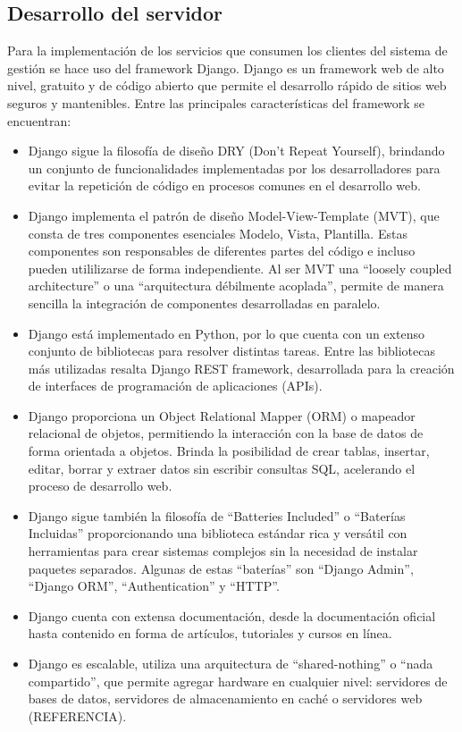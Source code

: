 \subsection{Desarrollo del servidor}
Para la implementación de los servicios que consumen los clientes del 
sistema de gestión se hace uso del framework Django. Django es un framework
web de alto nivel, gratuito y de código abierto que permite el desarrollo rápido de 
sitios web seguros y mantenibles. Entre las principales características
del framework se encuentran:

\begin{itemize}
    \item Django sigue la filosofía
    de diseño DRY (Don't Repeat Yourself), brindando un conjunto de funcionalidades implementadas
    por los desarrolladores para evitar la repetición de código en procesos
    comunes en el desarrollo web.
    \item Django implementa el patrón de diseño Model-View-Template (MVT), que
    consta de tres componentes esenciales Modelo, Vista,
    Plantilla. Estas componentes son responsables de diferentes
    partes del código e incluso pueden utililizarse de forma independiente. Al ser MVT una 
    ``loosely coupled architecture'' o una ``arquitectura
    débilmente acoplada'', permite de manera sencilla la integración de componentes
    desarrolladas en paralelo.
    \item Django está implementado en Python, por lo que cuenta con un 
    extenso conjunto de bibliotecas para resolver distintas tareas. Entre
    las bibliotecas más utilizadas resalta Django REST framework, desarrollada 
    para la creación de interfaces de programación de aplicaciones (APIs).
    \item Django proporciona un Object Relational Mapper (ORM) o mapeador
    relacional de objetos, permitiendo la interacción con la base de datos
    de forma orientada a objetos. Brinda la posibilidad de crear tablas, insertar,
    editar, borrar y extraer datos sin escribir consultas SQL, acelerando el proceso
    de desarrollo web. 
    \item Django sigue también la filosofía de ``Batteries Included'' o ``Baterías Incluidas''
    proporcionando una biblioteca estándar rica y versátil con herramientas para
    crear sistemas complejos sin la necesidad de instalar paquetes separados. Algunas de 
    estas ``baterías'' son ``Django Admin'', ``Django ORM'', ``Authentication'' y
    ``HTTP''.
    \item Django cuenta con extensa documentación, desde la documentación oficial hasta 
    contenido en forma de artículos, tutoriales y cursos en línea.
    \item Django es escalable, utiliza una arquitectura de ``shared-nothing'' o ``nada compartido'',
    que permite agregar hardware en cualquier nivel: servidores de bases de datos,
    servidores de almacenamiento en caché o servidores web (REFERENCIA).

\end{itemize}

